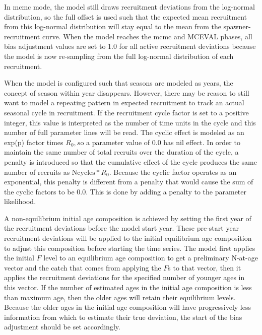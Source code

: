 In \gls{mcmc} mode, the model still draws recruitment deviations from the log-normal distribution, so the full offset is used such that the expected mean recruitment from this log-normal distribution will stay equal to the mean from the spawner-recruitment curve. When the model reaches the \gls{mcmc} and MCEVAL phases, all bias adjustment values are set to 1.0 for all active recruitment deviations because the model is now re-sampling from the full log-normal distribution of each recruitment.

When the model is configured such that seasons are modeled as years, the concept of season within year disappears. However, there may be reason to still want to model a repeating pattern in expected recruitment to track an actual seasonal cycle in recruitment. If the recruitment cycle factor is set to a positive integer, this value is interpreted as the number of time units in the cycle and this number of full parameter lines will be read. The cyclic effect is modeled as an exp(p) factor times $R_{0}, s$o a parameter value of 0.0 has nil effect. In order to maintain the same number of total recruits over the duration of the cycle, a penalty is introduced so that the cumulative effect of the cycle produces the same number of recruits as $\text{Ncycles}*R_{0}$. Because the cyclic factor operates as an exponential, this penalty is different from a penalty that would cause the sum of the cyclic factors to be 0.0. This is done by adding a penalty to the parameter likelihood. %


A non-equilibrium initial age composition is achieved by setting the first year of the recruitment deviations before the model start year. These pre-start year recruitment deviations will be applied to the initial equilibrium age composition to adjust this composition before starting the time series. The model first applies the initial $F$ level to an equilibrium age composition to get a preliminary N-at-age vector and the catch that comes from applying the $F$s to that vector, then it applies the recruitment deviations for the specified number of younger ages in this vector. If the number of estimated ages in the initial age composition is less than maximum age, then the older ages will retain their equilibrium levels. Because the older ages in the initial age composition will have progressively less information from which to estimate their true deviation, the start of the bias adjustment should be set accordingly.

